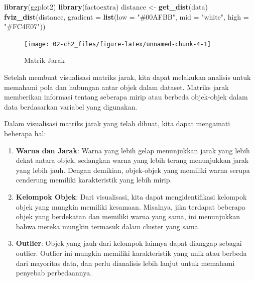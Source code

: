 \documentclass[
  oneside]{book}
\newenvironment{Shaded}{\begin{snugshade}}{\end{snugshade}}
\newcommand{\AttributeTok}[1]{\textcolor[rgb]{0.13,0.29,0.53}{#1}}
\newcommand{\FunctionTok}[1]{\textcolor[rgb]{0.13,0.29,0.53}{\textbf{#1}}}
\newcommand{\NormalTok}[1]{#1}
\newcommand{\OtherTok}[1]{\textcolor[rgb]{0.56,0.35,0.01}{#1}}
\newcommand{\StringTok}[1]{\textcolor[rgb]{0.31,0.60,0.02}{#1}}
\begin{document}
\begin{Shaded}
\begin{Highlighting}[]
\FunctionTok{library}\NormalTok{(ggplot2)}
\FunctionTok{library}\NormalTok{(factoextra)}
\NormalTok{distance }\OtherTok{\textless{}{-}} \FunctionTok{get\_dist}\NormalTok{(data)}
\FunctionTok{fviz\_dist}\NormalTok{(distance, }\AttributeTok{gradient =} \FunctionTok{list}\NormalTok{(}\AttributeTok{low =} \StringTok{"\#00AFBB"}\NormalTok{, }\AttributeTok{mid =} \StringTok{"white"}\NormalTok{, }\AttributeTok{high =} \StringTok{"\#FC4E07"}\NormalTok{))}
\end{Highlighting}
\end{Shaded}

\begin{figure}[h]

{\centering \texttt{[image: 02-ch2\_files/figure-latex/unnamed-chunk-4-1]} 

}

\caption{Matrik Jarak}\label{fig:unnamed-chunk-4}
\end{figure}

Setelah membuat visualisasi matriks jarak, kita dapat melakukan analisis untuk memahami pola dan hubungan antar objek dalam dataset. Matriks jarak memberikan informasi tentang seberapa mirip atau berbeda objek-objek dalam data berdasarkan variabel yang digunakan.

Dalam visualisasi matriks jarak yang telah dibuat, kita dapat mengamati beberapa hal:

\begin{enumerate}
\def\labelenumi{\arabic{enumi}.}
\item
  \textbf{Warna dan Jarak}:
  Warna yang lebih gelap menunjukkan jarak yang lebih dekat antara objek, sedangkan warna yang lebih terang menunjukkan jarak yang lebih jauh. Dengan demikian, objek-objek yang memiliki warna serupa cenderung memiliki karakteristik yang lebih mirip.
\item
  \textbf{Kelompok Objek}:
  Dari visualisasi, kita dapat mengidentifikasi kelompok objek yang mungkin memiliki kesamaan. Misalnya, jika terdapat beberapa objek yang berdekatan dan memiliki warna yang sama, ini menunjukkan bahwa mereka mungkin termasuk dalam cluster yang sama.
\item
  \textbf{Outlier}:
  Objek yang jauh dari kelompok lainnya dapat dianggap sebagai outlier. Outlier ini mungkin memiliki karakteristik yang unik atau berbeda dari mayoritas data, dan perlu dianalisis lebih lanjut untuk memahami penyebab perbedaannya.
\end{enumerate}
\end{document}
